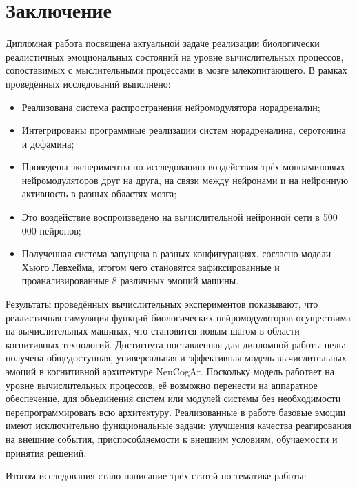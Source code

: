 \cleardoublepage
{}
{}
\chapter*{Заключение}
\label{chap:conclusion}
Дипломная работа посвящена актуальной задаче реализации биологически реалистичных эмоциональных состояний на уровне вычислительных процессов, сопоставимых с мыслительными процессами в мозге млекопитающего. В рамках проведённых исследований выполнено:
\begin{itemize}
\item Реализована система распространения нейромодулятора норадреналин;
\item Интегрированы программные реализации систем норадреналина, серотонина и дофамина;
\item Проведены эксперименты по исследованию воздействия трёх моноаминовых нейромодуляторов друг на друга, на связи между нейронами и на нейронную активность в разных областях мозга;
\item Это воздействие воспроизведено на вычислительной нейронной сети в 500 000 нейронов;
\item Полученная система запущена в разных конфигурациях, согласно модели Хьюго Левхейма, итогом чего становятся зафиксированные и проанализированные 8 различных эмоций машины.
\end{itemize}
	
	
Результаты проведённых вычислительных экспериментов показывают, что реалистичная симуляция функций биологических нейромодуляторов осуществима на вычислительных машинах, что становится новым шагом в области когнитивных технологий. Достигнута поставленная для дипломной работы цель: получена общедоступная, универсальная и эффективная модель вычислительных эмоций в когнитивной архитектуре NeuCogAr. Поскольку модель работает на уровне вычислительных процессов, её возможно перенести на аппаратное обеспечение, для объединения систем или модулей системы без необходимости перепрограммировать всю архитектуру. Реализованные в работе базовые эмоции имеют исключительно функциональные задачи: улучшения качества реагирования на внешние события, приспособляемости к внешним условиям, обучаемости и принятия решений.


Итогом исследования стало написание трёх статей по тематике работы:

